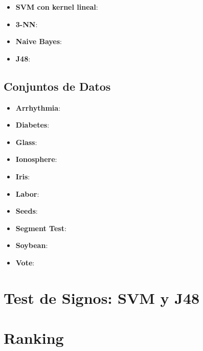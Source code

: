 \documentclass[10pt, a4paper,spanish]{article}
\begin{document}
			\begin{itemize}
				\item \textbf{SVM con kernel lineal}:
				\item \textbf{3-NN}:
				\item \textbf{Naive Bayes}:
				\item \textbf{J48}:
			\end{itemize}

		\subsection{Conjuntos de Datos}

			\begin{itemize}
				\item \textbf{Arrhythmia}:
				\item \textbf{Diabetes}:
				\item \textbf{Glass}:
				\item \textbf{Ionosphere}:
				\item \textbf{Iris}:
				\item \textbf{Labor}:
				\item \textbf{Seeds}:
				\item \textbf{Segment Test}:
				\item \textbf{Soybean}:
				\item \textbf{Vote}:
			\end{itemize}


	\section{Test de Signos: SVM y J48}

        \paragraph{}


	\section{Ranking}

        \paragraph{}
\end{document}
